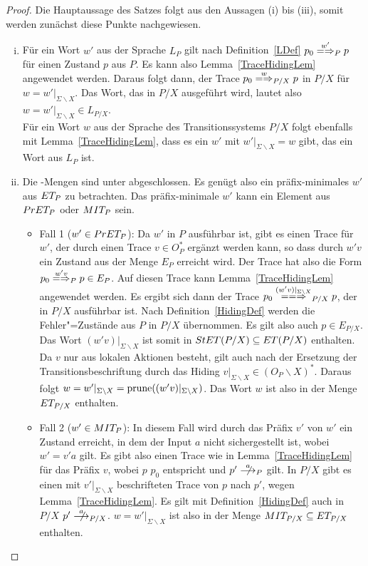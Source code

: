 \begin{proof}
  Die Hauptaussage des Satzes folgt aus den Aussagen (i) bis (iii), somit
  werden zunächst diese Punkte nachgewiesen.
  \begin{enumerate}[(i)]
    \item Für ein Wort $w'$ aus der Sprache $L_P$ gilt nach
      Definition~\ref{LDef} $p_0 \weakmay[w']_P p$ für einen Zustand $p$ aus
      $P$. Es kann also Lemma~\ref{TraceHidingLem} angewendet werden. Daraus
      folgt dann, der Trace $p_0 \weakmay[w]_{P/X} p$ in $P/X$ für
      $w=w'|_{\Sigma\backslash X}$. Das Wort, das in $P/X$ ausgeführt wird,
      lautet also $w=w'|_{\Sigma\backslash X}\in L_{P/X}$.\\
      Für ein Wort $w$ aus der Sprache des Transitionssystems $P/X$ folgt
      ebenfalls mit Lemma~\ref{TraceHidingLem}, dass es ein $w'$ mit
      $w'|_{\Sigma\backslash X} = w$ gibt, das ein Wort aus $L_P$ ist.
    \item Die \ET{}-Mengen sind unter \cont{} abgeschlossen. Es genügt also ein
      präfix-minimales $w'$ aus $ET _{P}$ zu betrachten. Das präfix-minimale
      $w'$ kann ein Element aus $PrET _P$ oder $MIT _P$ sein.
      \begin{itemize}
        \item Fall 1 ($w'\in PrET _P$): Da $w'$ in $P$ ausführbar ist, gibt es
          einen Trace für $w'$, der durch einen Trace $v \in O_P^*$ ergänzt
          werden kann, so dass durch $w'v$ ein Zustand aus der Menge $E_P$
          erreicht wird. Der Trace hat also die Form $p_0 \weakmay[w'v]_P p\in
          E_P$. Auf diesen Trace kann Lemma~\ref{TraceHidingLem} angewendet
          werden. Es ergibt sich dann der Trace $p_0 \lweakmay[(w'v)|_{\Sigma
          \backslash X}]_{P/X} p$, der in $P/X$ ausführbar ist. Nach
          Definition~\ref{HidingDef} werden die Fehler"=Zustände aus $P$ in
          $P/X$ übernommen. Es gilt also auch $p\in E_{P/X}$. Das Wort
          $(w'v)|_{\Sigma\backslash X}$ ist somit in $StET (P/X) \subseteq ET
          (P/X)$ enthalten. Da $v$ nur aus lokalen Aktionen besteht, gilt auch
          nach der Ersetzung der Transitionsbeschriftung durch das Hiding
          $v|_{\Sigma\backslash X}\in (O_P\backslash X)^*$. Daraus folgt $w =
          w'|_{\Sigma\backslash X} = \mathrm{prune} ((w'v)|_{\Sigma\backslash X})$. Das
          Wort $w$ ist also in der Menge $ET _{P/X}$ enthalten.
        \item Fall 2 ($w'\in MIT _P$): In diesem Fall wird durch das Präfix
          $v'$ von $w'$ ein Zustand erreicht, in dem der Input $a$ nicht
          sichergestellt ist, wobei $w'=v'a$ gilt. Es gibt also einen Trace wie
          in Lemma~\ref{TraceHidingLem} für das Präfix $v$, wobei $p$ $p_0$
          entspricht und $p'\nmust[a]_P$ gilt. In $P/X$ gibt es einen mit
          $v'|_{\Sigma\backslash X}$ beschrifteten Trace von $p$ nach $p'$,
          wegen Lemma~\ref{TraceHidingLem}. Es gilt mit
          Definition~\ref{HidingDef} auch in $P/X$ $p'\nmust[a]_{P/X}$. $w =
          w'|_{\Sigma\backslash X}$ ist also in der Menge $MIT _{P/X}
          \subseteq ET _{P/X}$ enthalten.
      \end{itemize}


\end{enumerate}
\end{proof}
